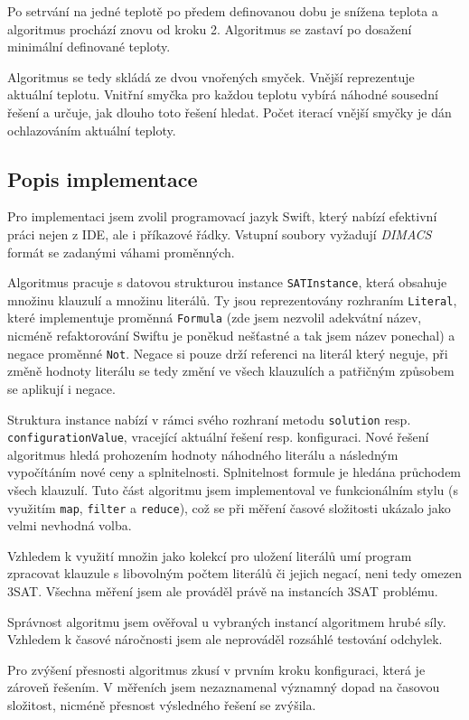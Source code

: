 \documentclass[czech]{article}
\begin{document}
Po setrvání na jedné teplotě po předem definovanou dobu je snížena teplota a algoritmus prochází znovu od kroku 2.
Algoritmus se zastaví po dosažení minimální definované teploty.

Algoritmus se tedy skládá ze dvou vnořených smyček.
Vnější reprezentuje aktuální teplotu.
Vnitřní smyčka pro každou teplotu vybírá náhodné sousední řešení a určuje, jak dlouho toto řešení hledat.
Počet iterací vnější smyčky je dán ochlazováním aktuální teploty.

\subsection{Popis implementace}

Pro implementaci jsem zvolil programovací jazyk Swift, který nabízí efektivní práci nejen z IDE, ale i příkazové řádky.
Vstupní soubory vyžadují \textit{DIMACS} formát se zadanými váhami proměnných.

Algoritmus pracuje s datovou strukturou instance \texttt{SATInstance}, která obsahuje množinu klauzulí a množinu literálů.
Ty jsou reprezentovány rozhraním \texttt{Literal}, které implementuje proměnná \texttt{Formula} (zde jsem nezvolil adekvátní název, nicméně refaktorování Swiftu je poněkud nešťastné a tak jsem název ponechal) a negace proměnné \texttt{Not}.
Negace si pouze drží referenci na literál který neguje, při změně hodnoty literálu se tedy změní ve všech klauzulích a patřičným způsobem se aplikují i negace.

Struktura instance nabízí v rámci svého rozhraní metodu \texttt{solution} resp. \texttt{configurationValue}, vracející aktuální řešení resp. konfiguraci.
Nové řešení algoritmus hledá prohozením hodnoty náhodného literálu a následným vypočítáním nové ceny a splnitelnosti.
Splnitelnost formule je hledána průchodem všech klauzulí.
Tuto část algoritmu jsem implementoval ve funkcionálním stylu (s využitím \texttt{map}, \texttt{filter} a \texttt{reduce}), což se při měření časové složitosti ukázalo jako velmi nevhodná volba.

Vzhledem k využití množin jako kolekcí pro uložení literálů umí program zpracovat klauzule s libovolným počtem literálů či jejich negací, neni tedy omezen 3SAT.
Všechna měření jsem ale prováděl právě na instancích 3SAT problému.

Správnost algoritmu jsem ověřoval u vybraných instancí algoritmem hrubé síly.
Vzhledem k časové náročnosti jsem ale neprováděl rozsáhlé testování odchylek.

Pro zvýšení přesnosti algoritmus zkusí v prvním kroku  konfiguraci, která je zároveň řešením.
V měřeních jsem nezaznamenal významný dopad na časovou složitost, nicméně přesnost výsledného řešení se zvýšila.
\end{document}
